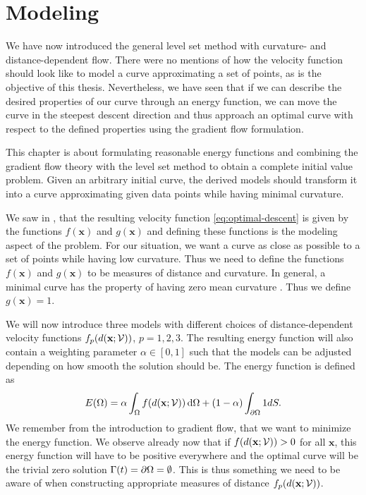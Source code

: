 \chapter{Modeling}\label{chap:modeling}
We have now introduced the general level set method with curvature- and distance-dependent flow. There were no mentions of how the velocity function should look like to model a curve approximating a set of points, as is the objective of this thesis. Nevertheless, we have seen that if we can describe the desired properties of our curve through an energy function, we can move the curve in the steepest descent direction and thus approach an optimal curve with respect to the defined properties using the gradient flow formulation.

This chapter is about formulating reasonable energy functions and combining the gradient flow theory with the level set method to obtain a complete initial value problem. Given an arbitrary initial curve, the derived models should transform it into a curve approximating given data points while having minimal curvature.

We saw in , that the resulting velocity function \eqref{eq:optimal-descent} is given by the functions $f(\mathbf{x})$ and $g(\mathbf{x})$ and defining these functions is the modeling aspect of the problem. For our situation, we want a curve as close as possible to a set of points while having low curvature. Thus we need to define the functions $f(\mathbf{x})$ and $g(\mathbf{x})$ to be measures of distance and curvature. In general, a minimal curve has the property of having zero mean curvature \cite{meancurv}. Thus we define $g(\mathbf{x})=1$.

We will now introduce three models with different choices of distance-dependent velocity functions $f_p(d(\textbf{x};\mathcal{V}))$, $p=1,2,3$. The resulting energy function will also 
contain a weighting parameter $\alpha \in [0, 1]$ such that the models can be adjusted depending on how smooth the solution should be. The energy function is defined as
\begin{equation}
    E(\Omega) = \alpha \int_{\Omega} f(d(\mathbf{x}; \mathcal{V})) \mathop{}\!\mathrm{d} \Omega + (1-\alpha) \int_{\partial \Omega} 1 dS.
\end{equation}
We remember from the introduction to gradient flow, that we want to minimize the energy function. We observe already now that if $f(d(\mathbf{x}; \mathcal{V}))>0$ for all $\mathbf{x}$, this energy function will have to be positive everywhere and the optimal curve will be the trivial zero solution $\Gamma (t) = \partial \Omega = \emptyset$. This is thus something we need to be aware of when constructing appropriate measures of distance $f_p(d(\textbf{x};\mathcal{V}))$.

